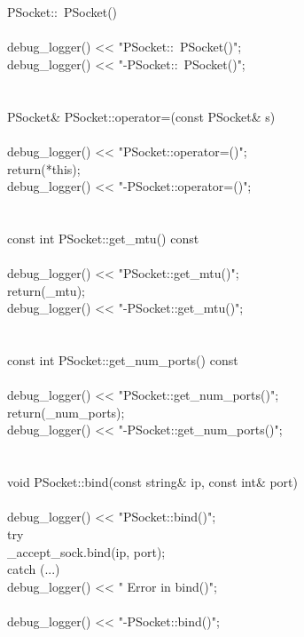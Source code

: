 \documentclass{article}
\begin{document}
\\
 
\\
 PSocket::~PSocket()
\\
 {
\\
     debug_logger() << "PSocket::~PSocket()\n";
\\
     debug_logger() << "-PSocket::~PSocket()\n";
\\
 }
\\
 
\\
 PSocket& PSocket::operator=(const PSocket& s)
\\
 {
\\
     debug_logger() << "PSocket::operator=()\n";
\\
     return(*this);
\\
     debug_logger() << "-PSocket::operator=()\n";    
\\
 }
\\
 
\\
 const int PSocket::get_mtu() const
\\
 {
\\
     debug_logger() << "PSocket::get_mtu()\n";
\\
     return(_mtu);
\\
     debug_logger() << "-PSocket::get_mtu()\n";    
\\
 }
\\
 
\\
 const int PSocket::get_num_ports() const
\\
 {
\\
     debug_logger() << "PSocket::get_num_ports()\n";
\\
     return(_num_ports);
\\
     debug_logger() << "-PSocket::get_num_ports()\n";    
\\
 }
\\
 
\\
 void PSocket::bind(const string& ip, const int& port)
\\
 {
\\
     debug_logger() << "PSocket::bind()\n";
\\
     try {
\\
                 _accept_sock.bind(ip, port);
\\
     } catch (...) {
\\
         debug_logger() << "    Error in bind()\n";
\\
     }
\\
     debug_logger() << "-PSocket::bind()\n";
\\
 }
\end{document}
